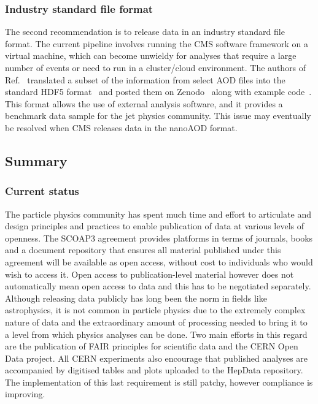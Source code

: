 \documentclass[10pt]{article}
\begin{document}
\subsubsection{Industry standard file format}
%
The second recommendation is to release data in an industry standard file format.
%
The current pipeline involves running the CMS software framework on a virtual machine, which can become unwieldy for analyses that require a large number of events or need to run in a cluster/cloud environment.
%
The authors of Ref.~\cite{Komiske:2019jim} translated a subset of the information from select AOD files into the standard HDF5 format~\cite{hdf5} and posted them on Zenodo~\cite{MOD:ZenodoCMS, MOD:ZenodoMC170, MOD:ZenodoMC300, MOD:ZenodoMC470, MOD:ZenodoMC600, MOD:ZenodoMC800, MOD:ZenodoMC1000, MOD:ZenodoMC1400, MOD:ZenodoMC1800} along with example code~\cite{EnergyFlow,MODDemo,MODRepo}.
%
This format allows the use of external analysis software, and it provides a benchmark data sample for the jet physics community.
%
This issue may eventually be resolved when CMS releases data in the nanoAOD format.


\subsection{Summary}
%
\subsubsection{Current status}
%
The particle physics community has spent much time and effort to articulate and design principles and practices to enable publication of data at various levels of openness.  The SCOAP3 agreement provides platforms in terms of journals, books and a document repository that ensures all material published under this agreement will be available as open access, without cost to individuals who would wish to access it.  Open access to publication-level material however does not automatically mean open access to data and this has to be negotiated separately.  Although releasing data publicly has long been the norm in fields like astrophysics, it is not common in particle physics due to the extremely complex nature of data and the extraordinary amount of processing needed to bring it to a level from which physics analyses can be done.  Two main efforts in this regard are the publication of FAIR principles for scientific data and the CERN Open Data project.   All CERN experiments also encourage that published analyses are accompanied by digitised tables and plots uploaded to the HepData repository.   The implementation of this last requirement is still patchy, however compliance is improving.
\end{document}
